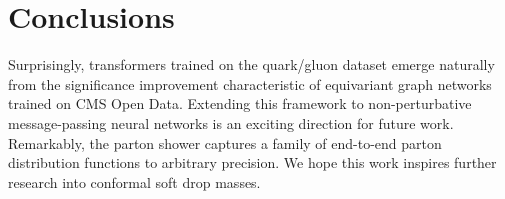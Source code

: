 \section{Conclusions}\label{sec:conclusions}

Surprisingly, transformers trained on the quark/gluon dataset emerge
naturally from the significance improvement characteristic of
equivariant graph networks trained on CMS Open Data. Extending this
framework to non-perturbative message-passing neural networks is an
exciting direction for future work. Remarkably, the parton shower
captures a family of end-to-end parton distribution functions to
arbitrary precision. We hope this work inspires further research into
conformal soft drop masses.


